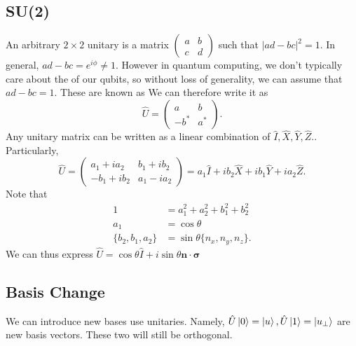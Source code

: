 \documentclass{article}
\numberwithin{equation}{section}
\begin{document}
\subsection{SU(2)}
An arbitrary $2\times 2$ unitary is a matrix $\begin{pmatrix}
    a & b \\ c & d
\end{pmatrix}$ such that $|ad-bc|^2=1$. In general, $ad-bc = e^{i\phi} \neq 1.$ However in quantum computing, we don't typically care about the  of our qubits, so without loss of generality, we can assume that $ad-bc=1$. These are known as  We can therefore write it as 
\begin{equation*}
    \hat{U} = \begin{pmatrix}
        a & b \\ 
        -b^* & a^*
    \end{pmatrix}.
\end{equation*}
Any unitary matrix can be written as a linear combination of $\hat{I}, \hat{X}, \hat{Y},\hat{Z}..$ Particularly,
\begin{equation}
    \hat{U} = \begin{pmatrix}
        a_1 + ia_2 & b_1+ib_2 \\ 
        -b_1 + ib_2 & a_1-ia_2
    \end{pmatrix} = a_1\hat{I} + ib_2\hat{X} + ib_1\hat{Y} + ia_2\hat{Z}.
\end{equation}
Note that
\begin{align}
    1 &= a_1^2 + a_2^2 + b_1^2 + b_2^2 \\
    a_1 &= \cos\theta \\ 
    \{b_2,b_1,a_2\} &= \sin\theta\{n_x,n_y,n_z\}.
\end{align}
We can thus express $\hat{U} = \cos\theta \hat{I} + i\sin\theta \bm{n} \cdot \bm{\sigma}$
\subsection{Basis Change}
We can introduce new bases use unitaries. Namely, $\hat{U}\ket 0 = \ket u, \hat{U}\ket 1 = \ket {u_\perp}$ are new basis vectors. These two will still be orthogonal.
\end{document}

